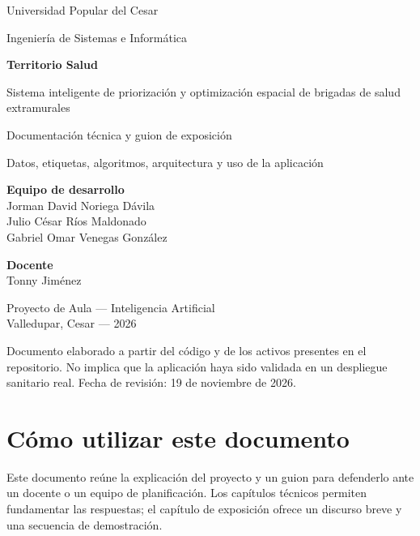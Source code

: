 \documentclass[11pt,a4paper]{report}
\begin{document}
\begin{titlepage}
\color{tinta}
{\large Universidad Popular del Cesar\par}
{\normalsize Ingeniería de Sistemas e Informática\par}
\vspace{2cm}
{\Huge\bfseries Territorio Salud\par}
\vspace{0.5cm}
{\LARGE Sistema inteligente de priorización y optimización espacial de brigadas de salud extramurales\par}
\vspace{1cm}
{\Large Documentación técnica y guion de exposición\par}
\vspace{0.5cm}
{\large Datos, etiquetas, algoritmos, arquitectura y uso de la aplicación\par}
\vfill
\textbf{Equipo de desarrollo}\\
Jorman David Noriega Dávila\\
Julio César Ríos Maldonado\\
Gabriel Omar Venegas González
\vspace{0.7cm}

\textbf{Docente}\\
Tonny Jiménez
\vspace{0.7cm}

Proyecto de Aula --- Inteligencia Artificial\\
Valledupar, Cesar --- 2026
\vspace{0.8cm}

{\small Documento elaborado a partir del código y de los activos presentes en el repositorio. No implica que la aplicación haya sido validada en un despliegue sanitario real. Fecha de revisión: 19 de noviembre de 2026.}
\end{titlepage}
\tableofcontents
\clearpage

\chapter*{Cómo utilizar este documento}
Este documento reúne la explicación del proyecto y un guion para defenderlo ante un docente o un equipo de planificación. Los capítulos técnicos permiten fundamentar las respuestas; el capítulo de exposición ofrece un discurso breve y una secuencia de demostración.
\end{document}
